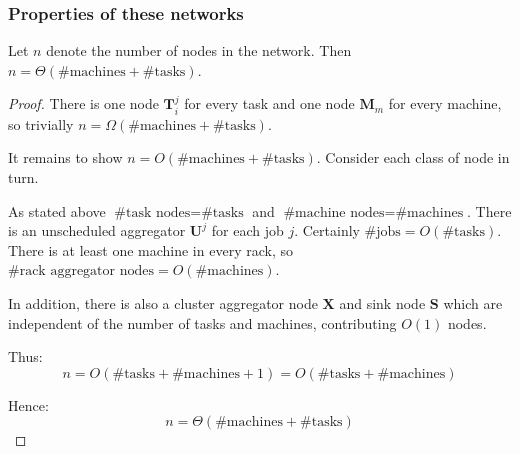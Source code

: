 \subsubsection{Properties of these networks}

\begin{lemma} \label{lemma:network-num-nodes}
Let $n$ denote the number of nodes in the network. Then $n = \Theta\left(\text{\# machines} + \text{\# tasks}\right)$.
\end{lemma}
\begin{proof}
There is one node $\mathbf{T}_i^j$ for every task and one node $\mathbf{M}_m$ for every machine, so trivially $n = \Omega\left(\text{\# machines} + \text{\# tasks}\right)$.

It remains to show $n = O\left(\text{\# machines} + \text{\# tasks}\right)$. Consider each class of node in turn.

As stated above $\text{\# task nodes} = \text{\# tasks}$ and $\text{\# machine nodes} = \text{\# machines}$. There is an unscheduled aggregator $\mathbf{U}^j$ for each job $j$. Certainly $\text{\# jobs} = O\left(\text{\# tasks}\right)$. There is at least one machine in every rack, so $\text{\# rack aggregator nodes} = O\left(\text{\# machines}\right)$. 

In addition, there is also a cluster aggregator node $\mathbf{X}$ and sink node $\mathbf{S}$ which are independent of the number of tasks and machines, contributing $O(1)$ nodes.

Thus:
\[n = O\left(\text{\# tasks} + \text{\# machines} + 1\right) = O\left(\text{\# tasks} + \text{\# machines}\right)\]

Hence:
\[n = \Theta\left(\text{\# machines} + \text{\# tasks}\right)\]
\end{proof}

